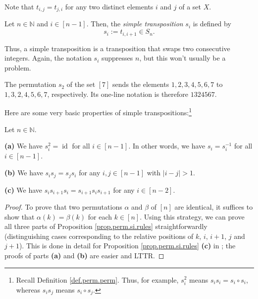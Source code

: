 Note that $t_{i,j}=t_{j,i}$ for any two distinct elements $i$ and $j$ of a set
$X$.

\begin{definition}
\label{def.perm.si}Let $n\in\mathbb{N}$ and $i\in\left[  n-1\right]  $. Then,
the \emph{simple transposition} $s_{i}$ is defined by%
\[
s_{i}:=t_{i,i+1}\in S_{n}.
\]

\end{definition}

Thus, a simple transposition is a transposition that swaps two consecutive
integers. Again, the notation $s_{i}$ suppresses $n$, but this won't usually
be a problem.

\begin{example}
The permutation $s_{2}$ of the set $\left[  7\right]  $ sends the elements
$1,2,3,4,5,6,7$ to $1,3,2,4,5,6,7$, respectively. Its one-line notation is
therefore $1324567$.
\end{example}

Here are some very basic properties of simple transpositions:\footnote{Recall
Definition \ref{def.perm.perm}. Thus, for example, $s_{i}^{2}$ means
$s_{i}s_{i}=s_{i}\circ s_{i}$, whereas $s_{i}s_{j}$ means $s_{i}\circ s_{j}$.}

\begin{proposition}
\label{prop.perm.si.rules}Let $n\in\mathbb{N}$. \medskip

\textbf{(a)} We have $s_{i}^{2}=\operatorname*{id}$ for all $i\in\left[
n-1\right]  $. In other words, we have $s_{i}=s_{i}^{-1}$ for all $i\in\left[
n-1\right]  $. \medskip

\textbf{(b)} We have $s_{i}s_{j}=s_{j}s_{i}$ for any $i,j\in\left[
n-1\right]  $ with $\left\vert i-j\right\vert >1$. \medskip

\textbf{(c)} We have $s_{i}s_{i+1}s_{i}=s_{i+1}s_{i}s_{i+1}$ for any
$i\in\left[  n-2\right]  $.
\end{proposition}

\begin{proof}
To prove that two permutations $\alpha$ and $\beta$ of $\left[  n\right]  $
are identical, it suffices to show that $\alpha\left(  k\right)  =\beta\left(
k\right)  $ for each $k\in\left[  n\right]  $. Using this strategy, we can
prove all three parts of Proposition \ref{prop.perm.si.rules}
straightforwardly (distinguishing cases corresponding to the relative
positions of $k$, $i$, $i+1$, $j$ and $j+1$). This is done in detail for
Proposition \ref{prop.perm.si.rules} \textbf{(c)} in \cite[solution to
Exercise 5.1 \textbf{(a)}]{detnotes}; the proofs of parts \textbf{(a)} and
\textbf{(b)} are easier and LTTR.
\end{proof}

